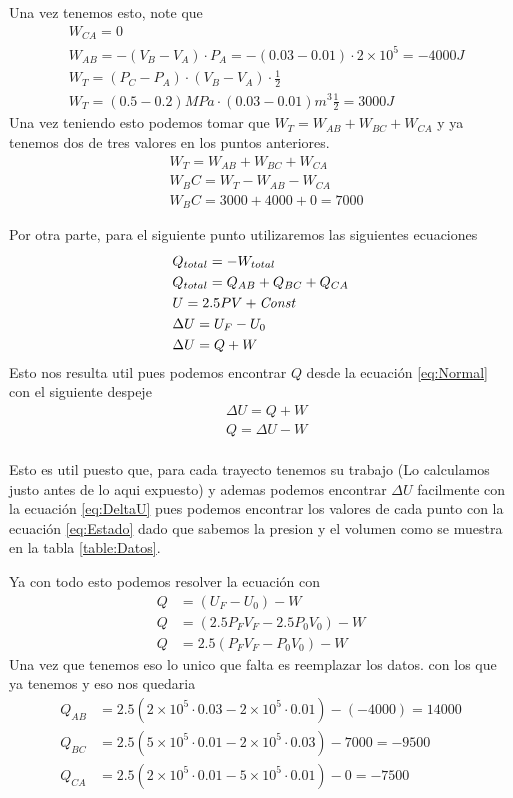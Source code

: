\documentclass[12pt]{exam}
\begin{document}
\begin{enumerate}
		Una vez tenemos esto, note que
		\begin{align*}
			& W_{CA} = 0\\
			& W_{AB} = -(V_B - V_A)\cdot P_A = -(0.03 - 0.01)\cdot 2\times 10^5 = -4000 J\\
			& W_T = (P_C - P_A)\cdot (V_B - V_A)\cdot\frac{1}{2}\\
			& W_T = (0.5-0.2)MPa\cdot(0.03-0.01)m^3\frac{1}{2} = 3000J
		\end{align*}
		Una vez teniendo esto podemos tomar que $W_T = W_{AB} + W_{BC} + W_{CA}$ y ya tenemos dos de tres valores en los puntos anteriores.
		\begin{align*}
			& W_T = W_{AB} + W_{BC} + W_{CA}\\
			& W_BC = W_T - W_{AB} - W_{CA}\\
			& W_BC = 3000 + 4000 + 0 = 7000
		\end{align*}

		Por otra parte, para el siguiente punto utilizaremos las siguientes ecuaciones
		\begin{align}
			& Q_{total} = - W_{total} \label{eq:Igual}\\
			& Q_{total} = Q_{AB} + Q_{BC} + Q_{CA}\label{eq:QTotal}\\
			& U =2.5 PV + \textit{Const \label{eq:Estado}}\\
			& \Delta U = U_F - U_0 \label{eq:DeltaU}\\
			& \Delta U = Q + W \label{eq:Normal}
		\end{align}
		Esto nos resulta util pues podemos encontrar $Q$ desde la ecuación \ref{eq:Normal} con el siguiente despeje
		\begin{align*}
			& \Delta U = Q + W\\
			& Q = \Delta U - W\\
		\end{align*}

		Esto es util puesto que, para cada trayecto tenemos su trabajo (Lo calculamos justo antes de lo aqui expuesto) y ademas podemos encontrar $\Delta U$ facilmente con la ecuación \ref{eq:DeltaU} pues podemos encontrar los valores de cada punto con la ecuación \ref{eq:Estado} dado que sabemos la presion y el volumen como se muestra en la tabla \ref{table:Datos}.

		Ya con todo esto podemos resolver la ecuación con
		\begin{align*}
			Q &= (U_F - U_0) - W\\
			Q &= (2.5 P_FV_F - 2.5 P_0V_0) - W\\
			Q &= 2.5(P_FV_F -P_0V_0) - W
		\end{align*}
		Una vez que tenemos eso lo unico que falta es reemplazar los datos. con los que ya tenemos y eso nos quedaria
		\begin{align*}
			Q_{AB} &= 2.5(2\times 10^5\cdot 0.03-2\times 10^5 \cdot 0.01)-(-4000) = 14000\\
			Q_{BC} &= 2.5(5\times 10^5\cdot 0.01-2\times 10^5 \cdot 0.03)-7000 = -9500\\
			Q_{CA} &= 2.5(2\times 10^5\cdot 0.01-5\times 10^5 \cdot 0.01)-0 = -7500
		\end{align*}


\end{enumerate}
\end{document}
